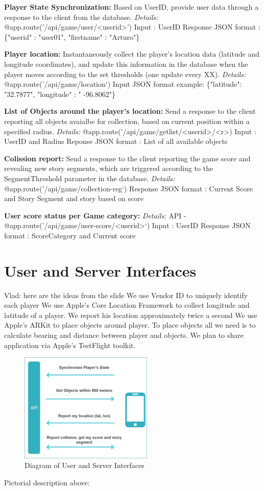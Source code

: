 \documentclass[conference]{IEEEtran}
\begin{document}
\textbf{Player State Synchronization:} Based on UserID, provide user data through a response to the client from the database.
\textit{Details:}
@app.route('/api/game/user/<userid>')
Input : UserID
Response JSON format : \big\{"userid" : "user01", "firstname" : "Arturo"\big\}

\textbf{Player location:} Instantaneously collect the player’s location data (latitude and longitude coordinates), and update this information in the database when the player moves according to the set thresholds (one update every XX).
\textit{Details:}
@app.route('/api/game/location‘)
Input JSON format example: \big\{"latitude":  "32.7877", "longitude" : " -96.8062"\big\}

\textbf{List of Objects around the player’s location:} Send a response to the client reporting all objects avaialbe for collection, based on current position within a specified radius.
\textit{Details:}
@app.route('/api/game/getlist/<userid>/<r>)
Input : UserID and Radius
Reponse JSON format : List of all available objects

\textbf{Colission report:} Send a response to the client reporting the game score and revealing new story segments, which are triggered according to the SegmentThreshold parameter in the database. 
\textit{Details:}
@app.route('/api/game/collection-reg‘)
Response JSON format : Current Score and Story Segment and story based on score

\textbf{User score status per Game category:} 
\textit{Details:}
API - @app.route('/api/game/user-score/<userid>‘)
Input : UserID
Response JSON format : ScoreCategory and Current score

\section{User and Server Interfaces}

Vlad: here are the ideas from the slide
We use Vendor ID to uniquely identify each player
We use Apple’s Core Location Framework to collect longitude and latitude of a player. We report his location approximately twice a second
We use Apple’s ARKit to place objects around player. To place objects all we need is to calculate bearing and distance between player and objects. 
We plan to share application via Apple’s TestFlight toolkit.
\begin{figure}
\centering
\includegraphics[width=2.5in]{imgs/UserInterface.png}
\caption{Diagram of User and Server Interfaces}
\label{UserInterface}
\end{figure}
Pictorial description above:
\end{document}
